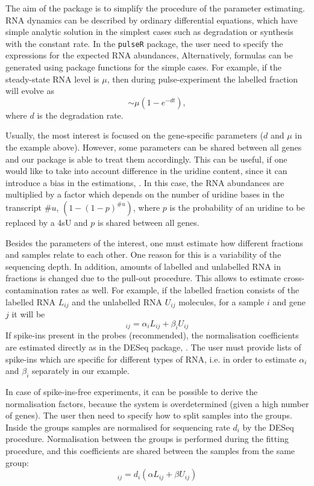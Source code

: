 \par The aim of the package is to simplify the procedure of the parameter estimating.
RNA dynamics can be described by ordinary differential equations,
which have simple analytic solution 
in the simplest cases such as degradation or synthesis with 
the constant rate. In the \verb|pulseR| package,
the user need to specify the expressions for the expected RNA abundances,
Alternatively, formulas can be generated using package functions for the 
simple cases. For example, if the steady-state RNA level is $\mu$, then
during pulse-experiment the labelled fraction will evolve as
\begin{equation}
 [\text{Labelled}] \sim \mu (1 - e^{-dt}),
\end{equation}
where $d$ is the degradation rate.
\par 
Usually, the most interest is focused on the gene-specific parameters ($d$ and $\mu$
in the example above). However, some parameters can be shared between all genes and
our package is able to treat them accordingly. This can be useful, if 
one would like to take into account difference in the uridine content, since
it can introduce a bias in the estimations, \citep{miller2011dynamic,
schwalb2012measurement}. In this case, the RNA abundances are multiplied by 
a factor which depends on the number of uridine bases in the transcript $\text{\#}u$,
$(1-(1-p)^{\text{\#}u})$, where $p$ is the probability of an uridine to be replaced
by a 4sU and $p$ is shared between all genes.
\par 
Besides the parameters of the interest, one must estimate how different fractions
and samples relate to each other. One reason for this is a variability of the sequencing
depth. In addition, amounts of labelled and unlabelled RNA in fractions is changed due to 
the pull-out procedure.
This allows to estimate cross-contamination rates as well. For example, 
if the labelled fraction consists of the labelled RNA $L_{ij}$ and the unlabelled RNA
 $U_{ij}$ molecules, for a sample $i$ and gene $j$ it will be
\begin{equation}
 [\text{labelled fraction}]_{ij}  = \alpha_{i} L_{ij} + \beta_{i} U_{ij}
\end{equation}
If spike-ins present in the probes (recommended), the normalisation coefficients 
are estimated directly as in the DESeq package, \citet{anders2010differential}. 
The user must provide lists of spike-ins which are  specific for different types of RNA, 
i.e. in order to estimate $\alpha_i$ and $\beta_i$ separately in our example.
\par
In case of spike-ins-free experiments, 
it can be possible to derive the normalisation factors, 
because the system is overdetermined (given a high number of genes).
The user then need to specify how to split samples into the groups.
Inside the groups samples are normalised for sequencing rate $d_i$ by
the DESeq procedure.
Normalisation between the groups is performed during the fitting procedure, 
and this coefficients are shared between the samples from the same group:
\begin{equation}
 [\text{labelled fraction}]_{ij}  = d_i(\alpha L_{ij} + \beta U_{ij})
\end{equation}

